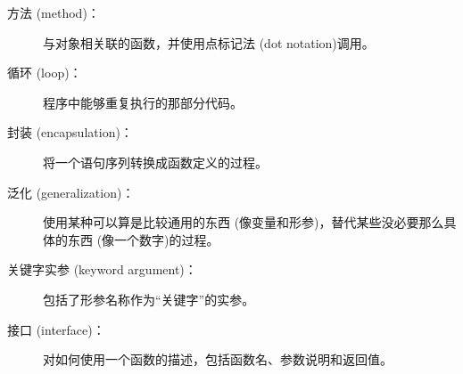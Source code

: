 \begin{description}


\item[方法 (method)：]
    与对象相关联的函数，并使用点标记法 (dot notation)调用。


\item[循环 (loop)：]
    程序中能够重复执行的那部分代码。


\item[封装 (encapsulation)：]
    将一个语句序列转换成函数定义的过程。


\item[泛化 (generalization)：]
    使用某种可以算是比较通用的东西 (像变量和形参)，替代某些没必要那么具体的东西 (像一个数字)的过程。


\item[关键字实参 (keyword argument)：]
    包括了形参名称作为“关键字”的实参。


\item[接口 (interface)：]
    对如何使用一个函数的描述，包括函数名、参数说明和返回值。



\end{description}
